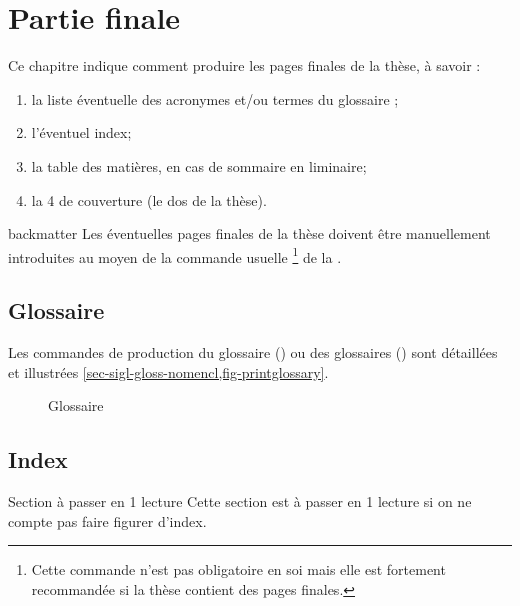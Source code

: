 \chapter{Partie finale}\label{cha-pages-finales}
%

Ce chapitre indique comment produire les pages finales de la thèse,
à savoir :
\begin{enumerate}
\item la liste éventuelle des acronymes et/ou
  termes du glossaire ;
\item l'éventuel index;
\item la table des matières, en cas de sommaire en \gls{liminaire};
\item la 4\ieme{} de couverture (le dos de la thèse).
\end{enumerate}

\begin{docCommand}{backmatter}{}
  Les éventuelles pages finales de la thèse doivent être manuellement
  introduites au moyen de la commande usuelle
  \footnote{Cette commande n'est pas obligatoire en
    soi mais elle est fortement recommandée si la thèse contient des pages
    finales.} de la \nofrontmatter.
\end{docCommand}

\section{Glossaire}
%

Les commandes de production du glossaire () ou
des glossaires () sont détaillées et illustrées
\vref{sec-sigl-gloss-nomencl,fig-printglossary}.

\begin{figure}[htbp]
  \centering
  \caption{Glossaire}
  \label{fig-printglossary}
\end{figure}

\section{Index}
%

\begin{dbremark*}{Section à passer en 1\iere{} lecture}
  Cette section est à passer en 1\iere{} lecture si on ne compte pas faire
  figurer d'index.
\end{dbremark*}

